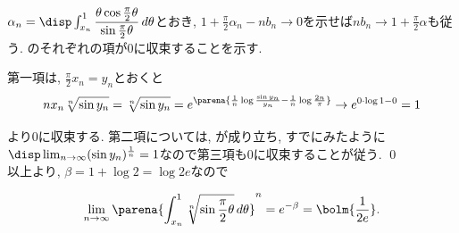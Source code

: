 \begin{prf}
$\alpha_n = \disp\int_{x_n}^{1} \dfrac{\theta\cos{\frac{\pi}{2}\theta}}{\sin{\frac{\pi}{2}\theta}}\, d\theta$とおき,
$1 + \frac{\pi}{2}\alpha_n - nb_n \to 0$を示せば$nb_n \to 1 + \frac{\pi}{2}\alpha$も従う.
のそれぞれの項が0に収束することを示す. \par
第一項は, $\frac{\pi}{2}x_n = y_n$とおくと
\[
nx_n\sqrt[n]{\sin{y_n}} = \sqrt[n]{\sin{y_n}} =  e^{\parena{\frac{1}{n} \log{\frac{\sin{y_n}}{y_n}} - \frac{1}{n}\log{\frac{2 n}{\pi}}}} \to e^{0\cdot \log{1} - 0} = 1
\]

より0に収束する.
第二項については,
が成り立ち, すでにみたように$\disp\lim_{n\to \infty} (\sin{y_n})^{\frac{1}{n}} = 1$なので第三項も0に収束することが従う. \qed \\
以上より, $\beta = 1 + \log{2} = \log{2e}$なので

\[
\lim_{n\to \infty} \parena{\int_{x_n}^{1} \sqrt[n]{\sin{\frac{\pi}{2}\theta}} \, d\theta }^n = e^{-\beta} =\bolm{\dfrac{1}{2e}}.
\]
\end{prf}
